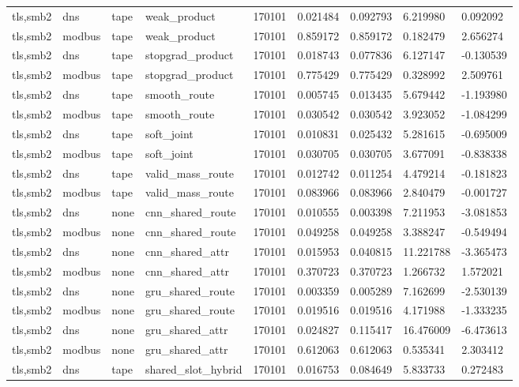 \begin{tabular}{lllllllll}
tls,smb2 & dns & tape & weak\_product & 170101 & 0.021484 & 0.092793 & 6.219980 & 0.092092 \\
tls,smb2 & modbus & tape & weak\_product & 170101 & 0.859172 & 0.859172 & 0.182479 & 2.656274 \\
tls,smb2 & dns & tape & stopgrad\_product & 170101 & 0.018743 & 0.077836 & 6.127147 & -0.130539 \\
tls,smb2 & modbus & tape & stopgrad\_product & 170101 & 0.775429 & 0.775429 & 0.328992 & 2.509761 \\
tls,smb2 & dns & tape & smooth\_route & 170101 & 0.005745 & 0.013435 & 5.679442 & -1.193980 \\
tls,smb2 & modbus & tape & smooth\_route & 170101 & 0.030542 & 0.030542 & 3.923052 & -1.084299 \\
tls,smb2 & dns & tape & soft\_joint & 170101 & 0.010831 & 0.025432 & 5.281615 & -0.695009 \\
tls,smb2 & modbus & tape & soft\_joint & 170101 & 0.030705 & 0.030705 & 3.677091 & -0.838338 \\
tls,smb2 & dns & tape & valid\_mass\_route & 170101 & 0.012742 & 0.011254 & 4.479214 & -0.181823 \\
tls,smb2 & modbus & tape & valid\_mass\_route & 170101 & 0.083966 & 0.083966 & 2.840479 & -0.001727 \\
tls,smb2 & dns & none & cnn\_shared\_route & 170101 & 0.010555 & 0.003398 & 7.211953 & -3.081853 \\
tls,smb2 & modbus & none & cnn\_shared\_route & 170101 & 0.049258 & 0.049258 & 3.388247 & -0.549494 \\
tls,smb2 & dns & none & cnn\_shared\_attr & 170101 & 0.015953 & 0.040815 & 11.221788 & -3.365473 \\
tls,smb2 & modbus & none & cnn\_shared\_attr & 170101 & 0.370723 & 0.370723 & 1.266732 & 1.572021 \\
tls,smb2 & dns & none & gru\_shared\_route & 170101 & 0.003359 & 0.005289 & 7.162699 & -2.530139 \\
tls,smb2 & modbus & none & gru\_shared\_route & 170101 & 0.019516 & 0.019516 & 4.171988 & -1.333235 \\
tls,smb2 & dns & none & gru\_shared\_attr & 170101 & 0.024827 & 0.115417 & 16.476009 & -6.473613 \\
tls,smb2 & modbus & none & gru\_shared\_attr & 170101 & 0.612063 & 0.612063 & 0.535341 & 2.303412 \\
tls,smb2 & dns & tape & shared\_slot\_hybrid & 170101 & 0.016753 & 0.084649 & 5.833733 & 0.272483 \\

\end{tabular}
